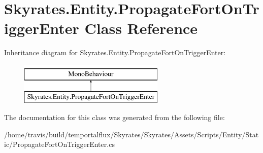 \hypertarget{class_skyrates_1_1_entity_1_1_propagate_fort_on_trigger_enter}{\section{Skyrates.\-Entity.\-Propagate\-Fort\-On\-Trigger\-Enter Class Reference}
\label{class_skyrates_1_1_entity_1_1_propagate_fort_on_trigger_enter}
}
Inheritance diagram for Skyrates.\-Entity.\-Propagate\-Fort\-On\-Trigger\-Enter\-:\begin{figure}[H]
\begin{center}
\leavevmode
\includegraphics[height=2.000000cm]{class_skyrates_1_1_entity_1_1_propagate_fort_on_trigger_enter}
\end{center}
\end{figure}


The documentation for this class was generated from the following file\-:\begin{DoxyCompactItemize}
\item 
/home/travis/build/temportalflux/\-Skyrates/\-Skyrates/\-Assets/\-Scripts/\-Entity/\-Static/Propagate\-Fort\-On\-Trigger\-Enter.\-cs\end{DoxyCompactItemize}
